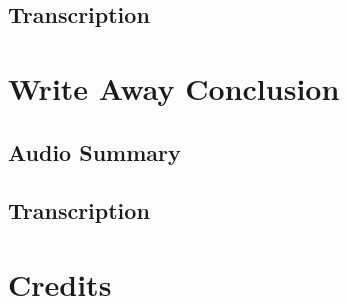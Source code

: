 \subsection{Transcription}

\section{Write Away Conclusion}

\subsection{Audio Summary}

\subsection{Transcription}

\section{Credits}